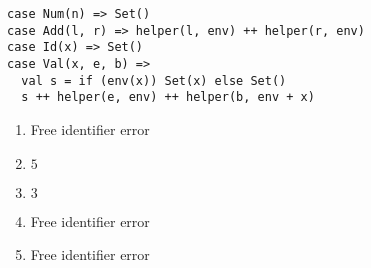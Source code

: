\textbf{}
\vspace{-1em}
\begin{verbatim}
case Num(n) => Set()
case Add(l, r) => helper(l, env) ++ helper(r, env)
case Id(x) => Set()
case Val(x, e, b) =>
  val s = if (env(x)) Set(x) else Set()
  s ++ helper(e, env) ++ helper(b, env + x)
\end{verbatim}

\textbf{}
\begin{enumerate}
  \item Free identifier error
  \item $5$
  \item $3$
  \item Free identifier error
  \item Free identifier error
\end{enumerate}

\textbf{}

